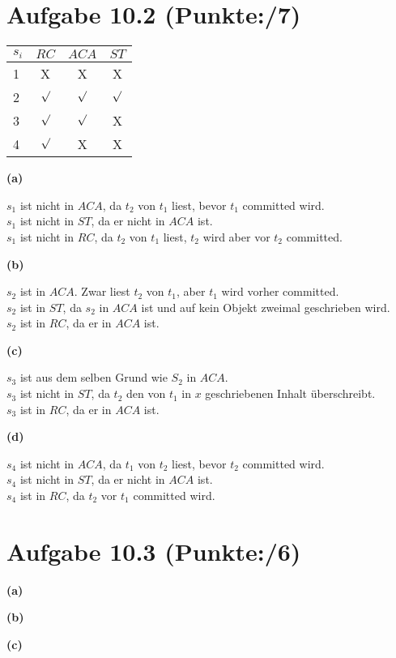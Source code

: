 \documentclass[11pt, a4paper]{article}
\newcommand{\blattnummer}{10}
\newcommand{\pp}{7}
\newcommand{\ppp}{6}
\newcommand{\aufgabe}[2] {\section*{Aufgabe \blattnummer.#1 (Punkte:\qquad/#2)}}
\newcommand{\aufgabenteil}[1] {\textbf{(#1)}}
\begin{document}
\aufgabe{2}{\pp}

\begin{table}[h!]
  \centering
  \begin{tabular}{l|c|c|c}
    $s_i$ & $RC$ & $ACA$ & $ST$\\
    \hline
    	1 & X & X & X\\
	2 & $\surd$  & $\surd$  & $\surd$ \\
	3 & $\surd$ & $\surd$ & X\\
	4 & $\surd$ & X & X\\
  \end{tabular}
\end{table}

\aufgabenteil{a}
\begin{adjustwidth}{20pt}{20pt}
$s_1$ ist nicht in $ACA$, da $t_2$ von $t_1$ liest, bevor $t_1$ committed wird.\\
$s_1$ ist nicht in $ST$, da er nicht in $ACA$ ist.\\
$s_1$ ist nicht in $RC$, da $t_2$ von $t_1$ liest, $t_2$ wird aber vor $t_2$ committed.\\
\end{adjustwidth}
\aufgabenteil{b}
\begin{adjustwidth}{20pt}{20pt}
$s_2$ ist in $ACA$. Zwar liest $t_2$ von $t_1$, aber $t_1$ wird vorher committed.\\
$s_2$ ist in $ST$, da $s_2$ in $ACA$ ist und auf kein Objekt zweimal geschrieben wird.\\
$s_2$ ist in $RC$, da er in $ACA$ ist.\\
\end{adjustwidth}
\aufgabenteil{c}
\begin{adjustwidth}{20pt}{20pt}
$s_3$ ist aus dem selben Grund wie $S_2$ in $ACA$.\\
$s_3$ ist nicht in $ST$, da $t_2$ den von $t_1$ in $x$ geschriebenen Inhalt überschreibt.\\
$s_3$ ist in $RC$, da er in $ACA$ ist.\\
\end{adjustwidth}
\aufgabenteil{d}
\begin{adjustwidth}{20pt}{20pt}
$s_4$ ist nicht in $ACA$, da $t_1$ von $t_2$ liest, bevor $t_2$ committed wird.\\
$s_4$ ist nicht in $ST$, da er nicht in $ACA$ ist.\\
$s_4$ ist in $RC$, da $t_2$ vor $t_1$ committed wird.\\
\end{adjustwidth}



\aufgabe{3}{\ppp}
\aufgabenteil{a}
\begin{adjustwidth}{20pt}{20pt}

\end{adjustwidth}
\aufgabenteil{b}
\begin{adjustwidth}{20pt}{20pt}

\end{adjustwidth}
\aufgabenteil{c}
\begin{adjustwidth}{20pt}{20pt}

\end{adjustwidth}

\end{document}
